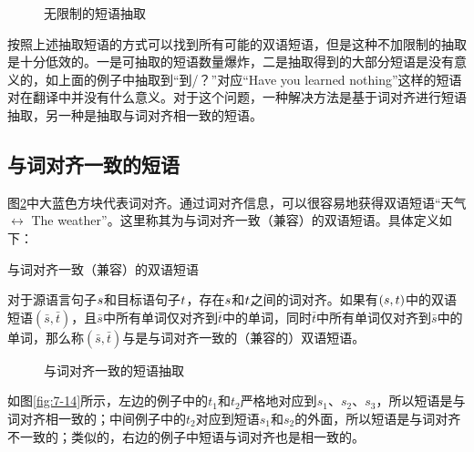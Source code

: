 \begin{figure}[htp]
\centering

\caption{无限制的短语抽取}
\label{fig:7-12}
\end{figure}

\parinterval 按照上述抽取短语的方式可以找到所有可能的双语短语，但是这种不加限制的抽取是十分低效的。一是可抽取的短语数量爆炸，二是抽取得到的大部分短语是没有意义的，如上面的例子中抽取到“到/？”对应“Have you learned nothing”这样的短语对在翻译中并没有什么意义。对于这个问题，一种解决方法是基于词对齐进行短语抽取，另一种是抽取与词对齐相一致的短语。


\subsection{与词对齐一致的短语}

\parinterval 图\ref{fig:7-13}中大蓝色方块代表词对齐。通过词对齐信息，可以很容易地获得双语短语“天气 $\leftrightarrow$ The weather”。这里称其为与词对齐一致（兼容）的双语短语。具体定义如下：

\vspace{0.5em}
\begin{definition} 与词对齐一致（兼容）的双语短语

{\small
对于源语言句子${s}$和目标语句子${t}$，存在${s}$和${t}$之间的词对齐。如果有$({s},{t})$中的双语短语$(\bar{s},\bar{t})$，且$\bar{s}$中所有单词仅对齐到$\bar{t}$中的单词，同时$\bar{t}$中所有单词仅对齐到$\bar{s}$中的单词，那么称$(\bar{s},\bar{t})$与是与词对齐一致的（兼容的）双语短语。
}
\end{definition}

\begin{figure}[htp]
\centering

\caption{与词对齐一致的短语抽取}
\label{fig:7-13}
\end{figure}

\parinterval 如图\ref{fig:7-14}所示，左边的例子中的$t_1$和$t_2$严格地对应到$s_1$、$s_2$、$s_3$，所以短语是与词对齐相一致的；中间例子中的$t_2$对应到短语$s_1$和$s_2$的外面，所以短语是与词对齐不一致的；类似的，右边的例子中短语与词对齐也是相一致的。

